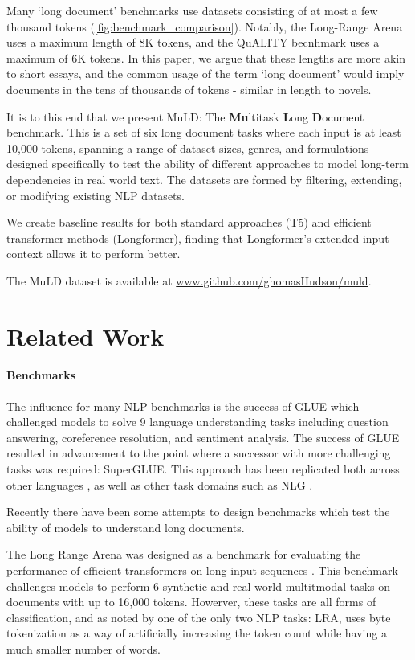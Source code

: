\documentclass[10pt, a4paper]{article}
\begin{document}
Many `long document' benchmarks use datasets consisting of at most a few thousand tokens (\autoref{fig:benchmark_comparison}). Notably, the Long-Range Arena \cite{Tay_2021LongRangeArena} uses a maximum length of 8K tokens, and the QuALITY becnhmark \cite{Pang_2021} uses a maximum of 6K tokens. In this paper, we argue that these lengths are more akin to short essays, and the common usage of the term `long document' would imply documents in the tens of thousands of tokens - similar in length to novels.

It is to this end that we present MuLD: The \textbf{Mu}ltitask \textbf{L}ong \textbf{D}ocument benchmark. This is a set of six long document tasks where each input is at least 10,000 tokens, spanning a range of dataset sizes, genres, and formulations designed specifically to test the ability of different approaches to model long-term dependencies in real world text. The datasets are formed by filtering, extending, or modifying existing NLP datasets.

We create baseline results for both standard approaches (T5) and efficient transformer methods (Longformer), finding that Longformer's extended input context allows it to perform better. 

The MuLD dataset is available at \url{www.github.com/ghomasHudson/muld}.

\section{Related Work}

\paragraph{Benchmarks}
The influence for many NLP benchmarks is the success of GLUE which challenged models to solve 9 language understanding tasks including question answering, coreference resolution, and sentiment analysis. The success of GLUE resulted in advancement to the point where a successor with more challenging tasks was required: SuperGLUE. This approach has been replicated both across other languages \cite{Yao_2021}, as well as other task domains such as NLG \cite{Liu_2021}.

Recently there have been some attempts to design benchmarks which test the ability of models to understand long documents.

The Long Range Arena was designed as a benchmark for evaluating the performance of efficient transformers on long input sequences \cite{Tay_2021LongRangeArena}. This benchmark challenges models to perform 6 synthetic and real-world multitmodal tasks on documents with up to 16,000 tokens. Howerver, these tasks are all forms of classification, and as noted by  one of the only two NLP tasks: LRA, uses byte tokenization as a way of artificially increasing the token count while having a much smaller number of words.
\end{document}

